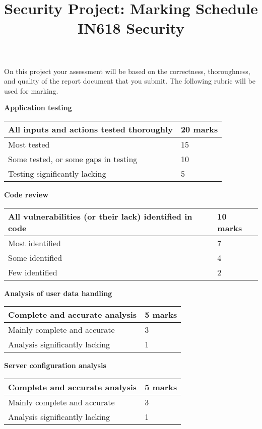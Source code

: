 \documentclass{article}
\begin{document}
\title{ Security Project: Marking Schedule\\ IN618 Security}
\date{}
\maketitle

On this project your assessment will be based on the correctness, thoroughness, and quality of the report document that you submit. The following rubric will be used for marking.

\textbf{Application testing}

\begin{tabular}{|l|l|} 
	\hline
	All inputs and actions tested thoroughly     & 20  marks \\ \hline
	Most tested                                  & 15 \\ \hline
	Some tested, or some gaps in testing		 & 10 \\  \hline
	Testing significantly lacking				 &  5 \\ \hline	
\end{tabular}

\textbf{Code review}

\begin{tabular}{|l|l|} 
	\hline
	All vulnerabilities (or their lack) identified in code     & 10  marks \\ \hline
	Most identified                                            & 7 \\ \hline
	Some identified		                                       & 4 \\  \hline
	Few identified			                    			   & 2 \\ \hline	
\end{tabular}

\textbf{Analysis of user data handling}

\begin{tabular}{|l|l|} 
	\hline
	Complete and accurate analysis                             & 5  marks \\ \hline
	Mainly complete and accurate                               & 3 \\ \hline
	Analysis significantly lacking		                       & 1 \\  \hline	
\end{tabular}

\textbf{Server configuration analysis}

\begin{tabular}{|l|l|} 
	\hline
	Complete and accurate analysis                             & 5  marks \\ \hline
	Mainly complete and accurate                               & 3 \\ \hline
	Analysis significantly lacking		                       & 1 \\  \hline	
\end{tabular}
\end{document}
